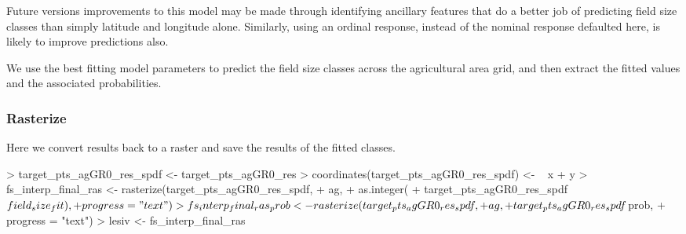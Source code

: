 \documentclass{article}
\begin{document}
Future versions improvements to this model may be made through identifying ancillary features that do a better job of predicting field size classes than simply latitude and longitude alone. Similarly, using an ordinal response, instead of the nominal response defaulted here, is likely to improve predictions also.


We use the best fitting model parameters to predict the field size classes across the agricultural area grid, and then extract the fitted values and the associated probabilities.
\begin{Schunk}
\end{Schunk}

\subsubsection{Rasterize}

Here we convert results back to a raster and save the results of the fitted classes.

\begin{Schunk}
\begin{Sinput}
> target_pts_agGR0_res_spdf <- target_pts_agGR0_res
> coordinates(target_pts_agGR0_res_spdf) <- ~ x + y
> fs_interp_final_ras <- rasterize(target_pts_agGR0_res_spdf,
+                                  ag,
+                                  as.integer(
+                                  target_pts_agGR0_res_spdf$field_size_fit),
+                                  progress = "text")
> fs_interp_final_ras_prob <- rasterize(target_pts_agGR0_res_spdf,
+                                       ag,
+                                       target_pts_agGR0_res_spdf$prob,
+                                       progress = "text")
> lesiv <- fs_interp_final_ras
\end{Sinput}
\end{Schunk}
\end{document}
